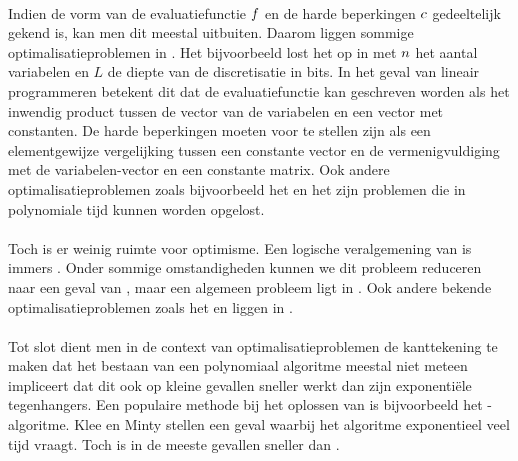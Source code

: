 \paragraph{}
Indien de vorm van de evaluatiefunctie $f$ en de harde beperkingen $c$ gedeeltelijk gekend is, kan men dit meestal uitbuiten. Daarom liggen sommige optimalisatieproblemen in . Het \cite{linearProgrammingInP} bijvoorbeeld lost het  op in  met $n$ het aantal variabelen en $L$ de diepte van de discretisatie in bits. In het geval van lineair programmeren betekent dit dat de evaluatiefunctie kan geschreven worden als het inwendig product tussen de vector van de variabelen en een vector met constanten. De harde beperkingen moeten voor te stellen zijn als een elementgewijze vergelijking tussen een constante vector en de vermenigvuldiging met de variabelen-vector en een constante matrix. Ook andere optimalisatieproblemen zoals bijvoorbeeld het  en het  zijn problemen die in polynomiale tijd kunnen worden opgelost.

\paragraph{}
Toch is er weinig ruimte voor optimisme. Een logische veralgemening van  is immers . Onder sommige omstandigheden kunnen we dit probleem reduceren\cite{Kozlov1980223} naar een geval van , maar een algemeen  probleem ligt in \cite{qpInNP}. Ook andere bekende optimalisatieproblemen zoals het  en  liggen in .

\paragraph{}
Tot slot dient men in de context van optimalisatieproblemen de kanttekening te maken dat het bestaan van een polynomiaal algoritme meestal niet meteen impliceert dat dit ook op kleine gevallen sneller werkt dan zijn exponenti\"ele tegenhangers. Een populaire methode bij het oplossen van  is bijvoorbeeld het -algoritme. Klee en Minty\cite{klee:1972} stellen een geval waarbij het algoritme exponentieel veel tijd vraagt. Toch is  in de meeste gevallen sneller dan .